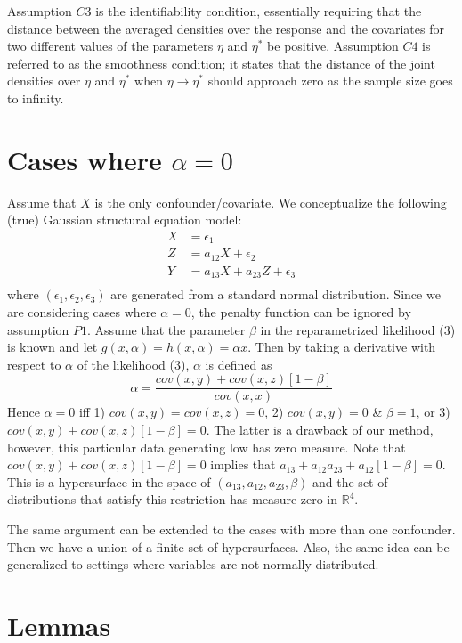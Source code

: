 \documentclass[11pt]{statsoc}
\begin{document}
Assumption $C3$ is  the identifiability condition, essentially requiring  that the distance
between the averaged densities over the response and the covariates for
two different values of the parameters $\eta$ and $\eta^*$ be
positive. Assumption $C4$ is referred to as the smoothness condition; it states that
the distance of the joint densities over $\eta$ and $\eta^*$ when  $\eta
\rightarrow \eta^*$ should approach zero as the sample size goes to infinity.

\section{Cases where $\alpha=0$ }
\label{app:measure}

Assume that $X$ is the only confounder/covariate. We conceptualize the following (true) Gaussian structural equation model: 
\begin{align*}
X&=\epsilon_1 \\
Z&=a_{12}X+\epsilon_2  \\
Y&=a_{13}X+a_{23}Z+\epsilon_3  \\
\end{align*}
where $(\epsilon_1,\epsilon_2,\epsilon_3)$ are generated  from a standard normal distribution.  
Since we are considering cases where $\alpha=0$, the penalty function can be ignored by assumption $P1$. Assume that the parameter $\beta$ in the reparametrized likelihood (3) is known and let $g(x,\alpha)=h(x,\alpha)=\alpha x$. Then by taking a derivative with respect to  $\alpha$ of the likelihood (3), $\alpha$  is defined as
\[
\alpha=\frac{cov(x,y)+cov(x,z)[1-\beta]}{cov(x,x)}
\]
Hence $\alpha=0$ iff 1) $cov(x,y)=cov(x,z)=0$, 2) $cov(x,y)=0$ \& $\beta=1$, or 3) $cov(x,y)+cov(x,z)[1-\beta]=0$. The latter is a drawback of our method, however, this particular data generating low has zero measure. Note that $cov(x,y)+cov(x,z)[1-\beta]=0$ implies that $a_{13}+a_{12}a_{23}+a_{12}[1-\beta]=0$. This is a hypersurface in the space of $(a_{13},a_{12},a_{23},\beta)$ and the set of distributions that satisfy this restriction has measure zero in $\mathbb{R}^4$.  

The same argument can be extended to the cases with more than one confounder. Then we have a union of a finite set of hypersurfaces.  Also, the same idea can be generalized to settings where variables are not normally distributed.  

\section{ Lemmas}
\end{document}
